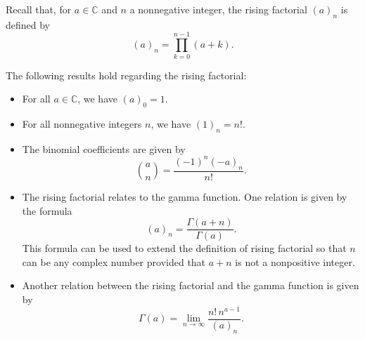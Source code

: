 \documentclass[12pt]{article}
\begin{document}

Recall that, for $a\in\mathbb{C}$ and $n$ a nonnegative integer, the rising factorial $(a)_n$ is defined by
\[
(a)_n=\prod_{k=0}^{n-1}(a+k).
\]

The following results hold regarding the rising factorial:

\begin{itemize}
\item For all $a\in\mathbb{C}$, we have $(a)_0=1$.
\item For all nonnegative integers $n$, we have $(1)_n=n!$.
\item The binomial coefficients are given by
\[
\binom{a}{n}=\frac{(-1)^n(-a)_n}{n!}.
\]
\item The rising factorial relates to the gamma function.  One relation is given by the formula
\[
(a)_n=\frac{\Gamma(a+n)}{\Gamma(a)}.
\]
This formula can be used to extend the definition of rising factorial so that $n$ can be any complex number provided that $a+n$ is not a nonpositive integer.
\item Another relation between the rising factorial and the gamma function is given by
\[
\Gamma(a)=\lim_{n\to\infty} \frac{n!\,n^{a-1}}{(a)_n}.
\]
\end{itemize}
\end{document}
